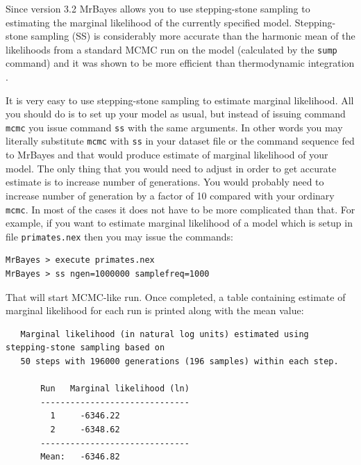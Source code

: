\documentclass[12pt]{book}
\newcommand{\ttt}[1]{\texttt{#1}}
\begin{document}
Since version 3.2 MrBayes allows you to use stepping-stone sampling \citep{xie11} to estimating the
marginal likelihood of the currently specified model. Stepping-stone sampling (SS) is considerably
more accurate than the harmonic mean of the likelihoods from a standard MCMC run on the model
(calculated by the \ttt{sump} command) and it was shown to be more efficient than thermodynamic
integration \citep{xie11}.

It is very easy to use stepping-stone sampling to estimate marginal likelihood. All you should do
is to set up your model as usual, but instead of issuing command \ttt{mcmc} you issue command
\ttt{ss} with the same arguments. In other words you may literally substitute \ttt{mcmc} with
\ttt{ss} in your dataset file or the command sequence fed to MrBayes and that would produce
estimate of marginal likelihood of your model. The only thing that you would need to adjust in
order to get accurate estimate is to increase number of generations. You would probably need to
increase number of generation by a factor of 10 compared with your ordinary \ttt{mcmc}. In most of
the cases it does not have to be more complicated than that. For example, if you want to estimate
marginal likelihood of a model which is setup in file \ttt{primates.nex} then you may issue the
commands:

\small
\begin{singlespacing}
\begin{verbatim}
MrBayes > execute primates.nex
MrBayes > ss ngen=1000000 samplefreq=1000
\end{verbatim}
\end{singlespacing}
\normalsize

That will start MCMC-like run. Once completed, a table containing estimate of marginal likelihood
for each run is printed along with the mean value:

\begin{singlespacing}
\scriptsize
\begin{verbatim}
   Marginal likelihood (in natural log units) estimated using stepping-stone sampling based on
   50 steps with 196000 generations (196 samples) within each step.

       Run   Marginal likelihood (ln)
       ------------------------------
         1     -6346.22
         2     -6348.62
       ------------------------------
       Mean:   -6346.82
\end{verbatim}
\normalsize
\end{singlespacing}
\end{document}
